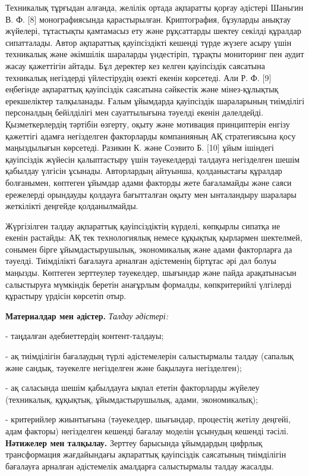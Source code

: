 \begin{multicols}{2}
Техникалық тұрғыдан алғанда, желілік ортада ақпаратты қорғау әдістері
Шаньгин В. Ф. {[}8{]} монографиясында қарастырылған. Криптография,
бұзуларды анықтау жүйелері, тұтастықты қамтамасыз ету және рұқсаттарды
шектеу секілді құралдар сипатталады. Автор ақпараттық қауіпсіздікті
кешенді түрде жүзеге асыру үшін техникалық және әкімшілік шараларды
үндестіріп, тұрақты мониторинг пен аудит жасау қажеттігін айтады. Бұл
деректер кез келген қауіпсіздік саясатына техникалық негіздерді
үйлестірудің өзекті екенін көрсетеді. Али Р. Ф. {[}9{]} еңбегінде
ақпараттық қауіпсіздік саясатына сәйкестік және мінез-құлықтық
ерекшеліктер талқыланады. Ғалым ұйымдарда қауіпсіздік шараларының
тиімділігі персоналдың бейілділігі мен сауаттылығына тәуелді екенін
дәлелдейді. Қызметкерлердің тәртібін өзгерту, оқыту және мотивация
принциптерін енгізу қажеттігі адамға негізделген факторларды компанияның
АҚ стратегиясына қосу маңыздылығын көрсетеді. Разикин К. және Соэвито Б.
{[}10{]} ұйым ішіндегі қауіпсіздік жүйесін қалыптастыру үшін
тәуекелдерді талдауға негізделген шешім қабылдау үлгісін ұсынады.
Авторлардың айтуынша, қолданыстағы құралдар болғанымен, көптеген ұйымдар
адами факторды жете бағаламайды және саяси ережелерді орындауды қолдауға
бағытталған оқыту мен ынталандыру шаралары жеткілікті деңгейде
қолданылмайды.

Жүргізілген талдау ақпараттық қауіпсіздіктің күрделі, көпқырлы сипатқа
ие екенін растайды: АҚ тек технологиялық немесе құқықтық қырлармен
шектелмей, сонымен бірге ұйымдастырушылық, экономикалық және адами
факторларға да тәуелді. Тиімділікті бағалауға арналған әдістеменің
біртұтас әрі дәл болуы маңызды. Көптеген зерттеулер тәуекелдер, шығындар
және пайда арақатынасын салыстыруға мүмкіндік беретін анағұрлым
формалды, көпкритерийлі үлгілерді құрастыру үрдісін көрсетіп отыр.

{\bfseries Материалдар мен әдістер.} \emph{Талдау әдістері:}

- таңдалған әдебиеттердің контент-талдауы;

- ақ тиімділігін бағалаудың түрлі әдістемелерін салыстырмалы талдау
(сапалық және сандық, тәуекелге негізделген және бақылауға
негізделген);

- ақ саласында шешім қабылдауға ықпал ететін факторларды жүйелеу
(техникалық, құқықтық, ұйымдастырушылық, адами, экономикалық);

- критерийлер жиынтығына (тәуекелдер, шығындар, процестің жетілу
деңгейі, адам факторы) негізделген кешенді бағалау моделін ұсынудың
кешенді тәсілі.
{\bfseries Нәтижелер мен талқылау.} Зерттеу барысында ұйымдардың цифрлық
трансформация жағдайындағы ақпараттық қауіпсіздік саясатының тиімділігін
бағалауға арналған әдістемелік амалдарға салыстырмалы талдау жасалды.


\end{multicols}
